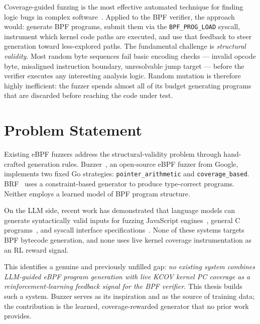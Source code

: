 Coverage-guided fuzzing is the most effective automated technique for finding logic
bugs in complex software~\cite{afl,syzkaller}.
Applied to the BPF verifier, the approach would: generate BPF programs, submit
them via the \texttt{BPF\_PROG\_LOAD} syscall, instrument which kernel code paths
are executed, and use that feedback to steer generation toward less-explored paths.
The fundamental challenge is \emph{structural validity}.
Most random byte sequences fail basic encoding checks --- invalid opcode byte,
misaligned instruction boundary, unresolvable jump target --- before the verifier
executes any interesting analysis logic.
Random mutation is therefore highly inefficient: the fuzzer spends almost all of
its budget generating programs that are discarded before reaching the code under
test.

\section{Problem Statement}
\label{sec:problem}

Existing eBPF fuzzers address the structural-validity problem through hand-crafted
generation rules.
Buzzer~\cite{buzzer}, an open-source eBPF fuzzer from Google, implements two
fixed Go strategies: \texttt{pointer\_arithmetic} and \texttt{coverage\_based}.
BRF~\cite{brf} uses a constraint-based generator to produce type-correct programs.
Neither employs a learned model of BPF program structure.

On the LLM side, recent work has demonstrated that language models can generate
syntactically valid inputs for fuzzing JavaScript engines~\cite{covrl}, general
C programs~\cite{fuzz4all}, and syscall interface specifications~\cite{kernelgpt}.
None of these systems targets BPF bytecode generation, and none uses live kernel
coverage instrumentation as an RL reward signal.

This identifies a genuine and previously unfilled gap: \textit{no existing system
combines LLM-guided eBPF program generation with live KCOV kernel PC coverage as
a reinforcement-learning feedback signal for the BPF verifier.}
This thesis builds such a system. Buzzer serves as its inspiration and as the
source of training data; the contribution is the learned, coverage-rewarded
generator that no prior work provides.

